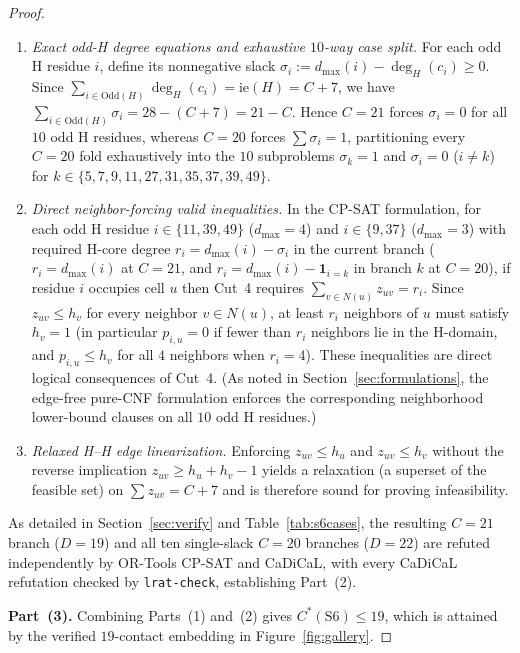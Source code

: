 \documentclass[11pt]{article}
\begin{document}
\begin{proof}
\begin{enumerate}[label=\textbf{Cut~\arabic*.},leftmargin=*,topsep=2pt,itemsep=2pt]
\item \emph{Exact odd-H degree equations and exhaustive $10$-way case split.} For each odd H residue $i$, define its nonnegative slack $\sigma_i := d_{\max}(i) - \deg_H(c_i) \ge 0$. Since $\sum_{i \in \mathrm{Odd}(H)} \deg_H(c_i) = \mathrm{ie}(H) = C + 7$, we have $\sum_{i \in \mathrm{Odd}(H)} \sigma_i = 28 - (C + 7) = 21 - C$. Hence $C = 21$ forces $\sigma_i = 0$ for all $10$ odd H residues, whereas $C = 20$ forces $\sum \sigma_i = 1$, partitioning every $C = 20$ fold exhaustively into the $10$ subproblems $\sigma_k = 1$ and $\sigma_i = 0$ ($i \ne k$) for $k \in \{5, 7, 9, 11, 27, 31, 35, 37, 39, 49\}$.
\item \emph{Direct neighbor-forcing valid inequalities.} In the CP-SAT formulation, for each odd H residue $i \in \{11, 39, 49\}$ ($d_{\max} = 4$) and $i \in \{9, 37\}$ ($d_{\max} = 3$) with required H-core degree $r_i = d_{\max}(i) - \sigma_i$ in the current branch ($r_i = d_{\max}(i)$ at $C = 21$, and $r_i = d_{\max}(i) - \mathbf{1}_{i = k}$ in branch $k$ at $C = 20$), if residue $i$ occupies cell $u$ then Cut~4 requires $\sum_{v \in N(u)} z_{uv} = r_i$. Since $z_{uv} \le h_v$ for every neighbor $v \in N(u)$, at least $r_i$ neighbors of $u$ must satisfy $h_v = 1$ (in particular $p_{i,u} = 0$ if fewer than $r_i$ neighbors lie in the H-domain, and $p_{i,u} \le h_v$ for all $4$ neighbors when $r_i = 4$). These inequalities are direct logical consequences of Cut~4. (As noted in Section~\ref{sec:formulations}, the edge-free pure-CNF formulation enforces the corresponding neighborhood lower-bound clauses on all $10$ odd H residues.)
\item \emph{Relaxed H--H edge linearization.} Enforcing $z_{uv} \le h_u$ and $z_{uv} \le h_v$ without the reverse implication $z_{uv} \ge h_u + h_v - 1$ yields a relaxation (a superset of the feasible set) on $\sum z_{uv} = C + 7$ and is therefore sound for proving infeasibility.
\end{enumerate}
As detailed in Section~\ref{sec:verify} and Table~\ref{tab:s6cases}, the resulting $C = 21$ branch ($D = 19$) and all ten single-slack $C = 20$ branches ($D = 22$) are refuted independently by OR-Tools CP-SAT and CaDiCaL, with every CaDiCaL refutation checked by \texttt{lrat-check}, establishing Part~(2).

\textbf{Part~(3).} Combining Parts~(1) and~(2) gives $C^*(\mathrm{S6}) \le 19$, which is attained by the verified $19$-contact embedding in Figure~\ref{fig:gallery}.
\end{proof}
\end{document}
